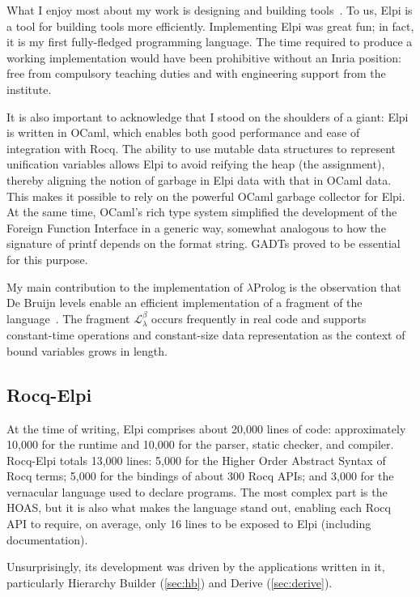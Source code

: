 \documentclass{these-ISSS}
\begin{document}
What I enjoy most about my work is designing and building
tools~\cite{DBLP:journals/jar/AspertiCTZ07,gonthier:inria-00258384,Coq-refman}.
To us, Elpi is a tool for building tools more efficiently. Implementing Elpi
was great fun; in fact, it is my first fully-fledged programming language. The
time required to produce a working implementation would have been prohibitive
without an Inria position: free from compulsory teaching duties and with
engineering support from the institute. %

It is also important to acknowledge that I stood on the shoulders of a
giant: Elpi is written in OCaml, which enables both good performance and
ease of integration with Rocq. The ability to use mutable data structures to
represent unification variables allows Elpi to avoid reifying the heap (the
assignment), thereby aligning the notion of garbage in Elpi data with that in
OCaml data. This makes it possible to rely on the powerful OCaml garbage
collector for Elpi. At the same time, OCaml's rich type system simplified the
development of the Foreign Function Interface in a generic way, somewhat
analogous to how the signature of printf depends on the format string.
GADTs proved to be essential for this purpose.

My main contribution to the implementation of $\lambda$Prolog is the
observation that De Bruijn levels enable an efficient implementation of a
fragment of the language~\cite{dunchev15lpar}. The fragment
$\mathcal{L}_\lambda^{\beta}$ occurs frequently in real code and supports
constant-time operations and constant-size data representation as the context
of bound variables grows in length.

\subsection{Rocq-Elpi}


At the time of writing, Elpi comprises about 20,000 lines of code:
approximately 10,000 for the runtime and 10,000 for the parser, static checker,
and compiler. Rocq-Elpi totals 13,000 lines: 5,000 for the Higher Order
Abstract Syntax of Rocq terms; 5,000 for the bindings of
about 300 Rocq APIs; and 3,000 for the vernacular language used to declare
programs. The most complex part is the HOAS, but it is also what makes the
language stand out, enabling each Rocq API to require, on average, only 16
lines to be exposed to Elpi (including documentation).

Unsurprisingly, its development was driven by the applications written in it,
particularly Hierarchy Builder (\cref{sec:hb}) and Derive (\cref{sec:derive}).
\end{document}

